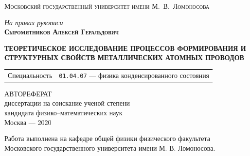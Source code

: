 \documentclass[10pt]{book}
\begin{document}
\thispagestyle{empty}

\begin{titlepage}
\centering
\textsc{\Large Московский государственный университет имени М.~В.~Ломоносова}

\vspace*{1cm}
\hfill \textit{На правах рукописи } \\
\vspace*{2cm}
\textsc{\bfseries Сыромятников Алексей Геральдович }\\
\rule{0cm}{1.2cm}
\begin{spacing}{1.6}
{\Large \bfseries \uppercase{Теоретическое исследование процессов формирования и структурных свойств металлических атомных проводов}}\\
\end{spacing}
\vspace*{1cm}
\begin{tabular}{ll}
Специальность  & \texttt{01.04.07} --- физика конденсированного состояния \\
\end{tabular}

\vspace*{3cm}
{\large \scshape \uppercase{автореферат}} \\
диссертации на соискание ученой степени \\
кандидата физико--математических наук \\
\vfill
Москва --- 2020

\end{titlepage}

\thispagestyle{empty} \singlespacing
\setlength{\parindent}{0cm}
Работа выполнена на кафедре общей физики физического факультета Московского государственного университета имени М. В. Ломоносова.\\
\end{document}

